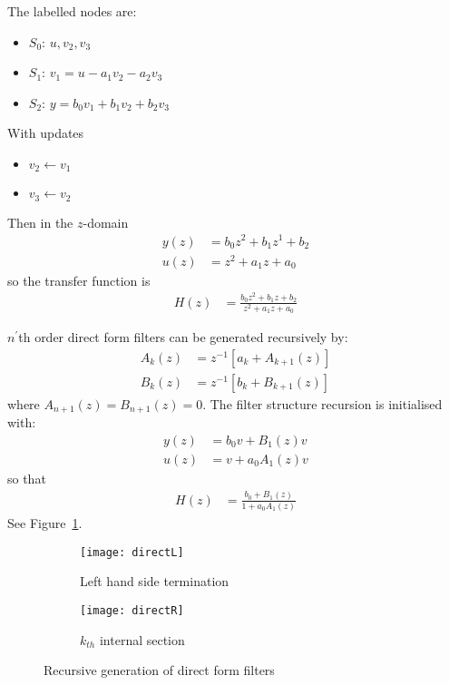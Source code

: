 \documentclass[a4paper,twoside,10pt,english]{report}
\begin{document}
The labelled nodes are:
\begin{itemize}
\item $S_{0}$: $u,v_{2},v_{3}$
\item $S_{1}$: $v_{1}=u-a_{1}v_{2}-a_{2}v_{3}$
\item $S_{2}$: $y=b_{0}v_{1}+b_{1}v_{2}+b_{2}v_{3}$
\end{itemize}
With updates 
\begin{itemize}
\item $v_{2}\leftarrow v_{1}$
\item $v_{3}\leftarrow v_{2}$
\end{itemize}
Then in the $z$-domain
\begin{align*}
y\left(z\right) &= b_{0}z^{2}+b_{1}z^{1}+b_{2}\\
u\left(z\right) &= z^{2}+a_{1}z+a_{0}
\end{align*}
so the transfer function is
\begin{align*}
H\left(z\right) &= \frac{b_{0}z^{2}+b_{1}z+b_{2}}{z^{2}+a_{1}z+a_{0}}
\end{align*}

$n^{'}$th order direct form filters can be generated recursively
by:
\begin{align*}
A_{k}\left(z\right) &= z^{-1}\left[a_{k}+A_{k+1}\left(z\right)\right]\\
B_{k}\left(z\right) &= z^{-1}\left[b_{k}+B_{k+1}\left(z\right)\right]
\end{align*}
where $A_{n+1}\left(z\right) = B_{n+1}\left(z\right)=0$. The filter
structure recursion is initialised with:
\begin{align*}
y\left(z\right) &= b_{0}v+B_{1}\left(z\right)v\\
u\left(z\right) &= v+a_{0}A_{1}\left(z\right)v
\end{align*}
so that 
\begin{align*}
H\left(z\right) &= \frac{b_{0}+B_{1}\left(z\right)}{1+a_{0}A_{1}\left(z\right)}
\end{align*}
See Figure~\ref{fig:Recursive-generation-of}.

\begin{figure}[!htbp]
\begin{subfigure}[b]{\textwidth}
\begin{center}
\texttt{[image: directL]}
\caption{Left hand side termination}
\vspace{1cm}
\end{center}
\end{subfigure}
\begin{subfigure}[b]{\textwidth}
\begin{center}
\texttt{[image: directR]}
\caption{$k_{th}$ internal section}
\end{center}
\end{subfigure}
\caption{Recursive generation of direct form filters}
\label{fig:Recursive-generation-of}
\end{figure}
\end{document}
